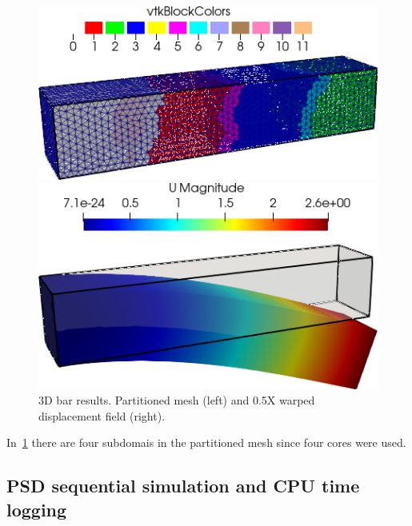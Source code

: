 {{\begin{figure}[htbp]
    \centering
    \begin{minipage}[t][2cm][t]{0.38\textwidth}
    \includegraphics[align=b,width=1\textwidth]{./Images/3d-bar-clamped-ends.png}
    \end{minipage}\hspace{.1\textwidth}
    \begin{minipage}[t][2cm][t]{0.4\textwidth}
    \includegraphics[align=b,width=1\textwidth]{./Images/3d-bar-clamped-pulled-partioned.png}
    \end{minipage}
    \caption{3D bar results. Partitioned mesh (left) and 0.5X warped displacement field (right).}
    \label{fig:3Dpart}
\end{figure}

In~\cref{fig:3Dpart} there are four subdomais in the partitioned mesh since four cores were used.

\pagebreak

\subsection{PSD sequential simulation  and CPU time logging \label{sec:seq-cpu}}

}}
